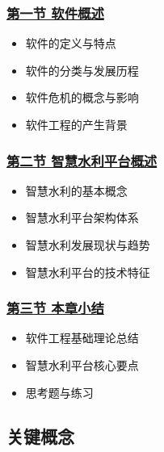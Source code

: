 \documentclass[12pt,a4paper]{article}
\providecommand{\tightlist}{%
  \setlength{\itemsep}{0pt}\setlength{\parskip}{0pt}}
\begin{document}
\subsubsection{\texorpdfstring{\href{section01-01.md}{第一节
软件概述}}{第一节 软件概述}}\label{ux7b2cux4e00ux8282-ux8f6fux4ef6ux6982ux8ff0}

\begin{itemize}
\tightlist
\item
  软件的定义与特点
\item
  软件的分类与发展历程
\item
  软件危机的概念与影响
\item
  软件工程的产生背景
\end{itemize}

\subsubsection{\texorpdfstring{\href{section01-02.md}{第二节
智慧水利平台概述}}{第二节 智慧水利平台概述}}\label{ux7b2cux4e8cux8282-ux667aux6167ux6c34ux5229ux5e73ux53f0ux6982ux8ff0}

\begin{itemize}
\tightlist
\item
  智慧水利的基本概念
\item
  智慧水利平台架构体系
\item
  智慧水利发展现状与趋势
\item
  智慧水利平台的技术特征
\end{itemize}

\subsubsection{\texorpdfstring{\href{section01-03.md}{第三节
本章小结}}{第三节 本章小结}}\label{ux7b2cux4e09ux8282-ux672cux7ae0ux5c0fux7ed3}

\begin{itemize}
\tightlist
\item
  软件工程基础理论总结
\item
  智慧水利平台核心要点
\item
  思考题与练习
\end{itemize}

\subsection{关键概念}\label{ux5173ux952eux6982ux5ff5}
\end{document}
